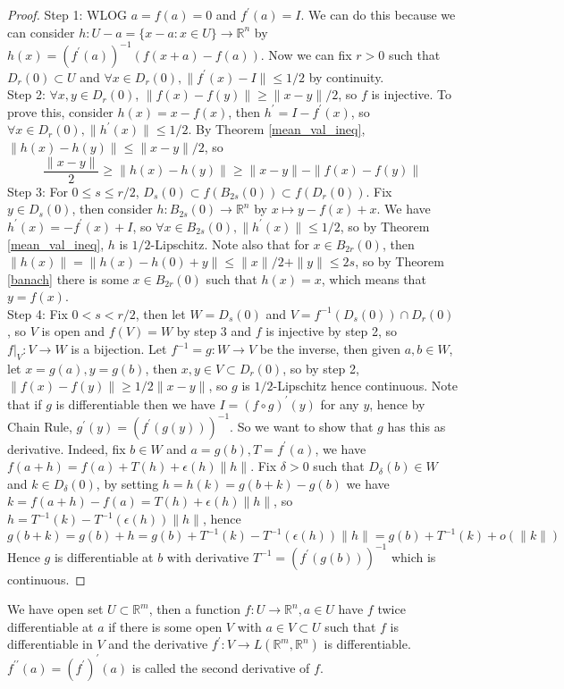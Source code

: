 \begin{proof}
    Step 1: WLOG $a=f(a)=0$ and $f^\prime(a)=I$.
    We can do this because we can consider $h:U-a=\{x-a:x\in U\}\to\mathbb R^n$ by $h(x)=(f^\prime(a))^{-1}(f(x+a)-f(a))$.
    Now we can fix $r>0$ such that $D_r(0)\subset U$ and $\forall x\in D_r(0),\|f^\prime(x)-I\|\le 1/2$ by continuity.\\
    Step 2: $\forall x,y\in D_r(0)$, $\|f(x)-f(y)\|\ge \|x-y\|/2$, so $f$ is injective.
    To prove this, consider $h(x)=x-f(x)$, then $h^\prime=I-f^\prime(x)$, so $\forall x\in D_r(0),\|h^\prime(x)\|\le 1/2$.
    By Theorem \ref{mean_val_ineq}, $\|h(x)-h(y)\|\le \|x-y\|/2$, so
    $$\frac{\|x-y\|}{2}\ge \|h(x)-h(y)\|\ge \|x-y\|-\|f(x)-f(y)\|$$
    Step 3: For $0\le s\le r/2$, $D_s(0)\subset f(B_{2s}(0))\subset f(D_r(0))$.
    Fix $y\in D_s(0)$, then consider $h:B_{2s}(0)\to\mathbb R^n$ by $x\mapsto y-f(x)+x$.
    We have $h^\prime(x)=-f^\prime(x)+I$, so $\forall x\in B_{2s}(0),\|h^\prime(x)\|\le 1/2$, so by Theorem \ref{mean_val_ineq}, $h$ is $1/2$-Lipschitz.
    Note also that for $x\in B_{2r}(0)$, then $\|h(x)\|=\|h(x)-h(0)+y\|\le \|x\|/2+\|y\|\le 2s$, so by Theorem \ref{banach} there is some $x\in B_{2r}(0)$ such that $h(x)=x$, which means that $y=f(x)$.\\
    Step 4: Fix $0<s<r/2$, then let $W=D_s(0)$ and $V=f^{-1}(D_s(0))\cap D_r(0)$, so $V$ is open and $f(V)=W$ by step 3 and $f$ is injective by step 2, so $f|_V:V\to W$ is a bijection.
    Let $f^{-1}=g:W\to V$ be the inverse, then given $a,b\in W$, let $x=g(a),y=g(b)$, then $x,y\in V\subset D_r(0)$, so by step 2, $\|f(x)-f(y)\|\ge 1/2\|x-y\|$, so $g$ is $1/2$-Lipschitz hence continuous.
    Note that if $g$ is differentiable then we have $I=(f\circ g)^\prime(y)$ for any $y$, hence by Chain Rule, $g^\prime(y)=(f^\prime(g(y)))^{-1}$.
    So we want to show that $g$ has this as derivative.
    Indeed, fix $b\in W$ and $a=g(b),T=f^\prime(a)$, we have $f(a+h)=f(a)+T(h)+\epsilon(h)\|h\|$.
    Fix $\delta>0$ such that $D_\delta(b)\in W$ and $k\in D_\delta(0)$, by setting $h=h(k)=g(b+k)-g(b)$ we have $k=f(a+h)-f(a)=T(h)+\epsilon(h)\|h\|$, so $h=T^{-1}(k)-T^{-1}(\epsilon(h))\|h\|$, hence
    $$g(b+k)=g(b)+h=g(b)+T^{-1}(k)-T^{-1}(\epsilon(h))\|h\|=g(b)+T^{-1}(k)+o(\|k\|)$$
    Hence $g$ is differentiable at $b$ with derivative $T^{-1}=(f^\prime(g(b)))^{-1}$ which is continuous.
\end{proof}
\begin{definition}
    We have open set $U\subset\mathbb R^m$, then a function $f:U\to\mathbb R^n,a\in U$ have $f$ twice differentiable at $a$ if there is some open $V$ with $a\in V\subset U$ such that $f$ is differentiable in $V$ and the derivative $f^\prime:V\to L(\mathbb R^m,\mathbb R^n)$ is differentiable.
    $f^{\prime\prime}(a)=(f^\prime)^\prime(a)$ is called the second derivative of $f$.
\end{definition}
